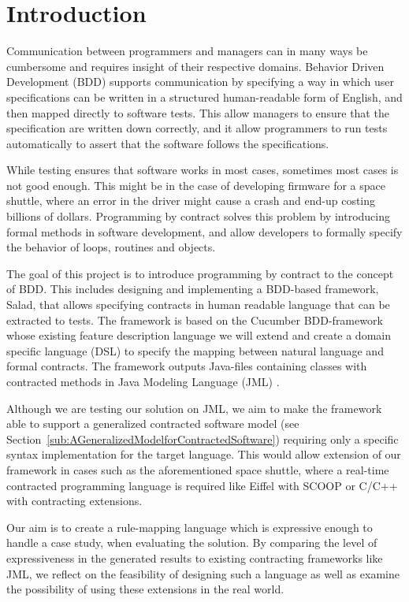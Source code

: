 \section{Introduction} %

Communication between programmers and managers can in many ways be cumbersome and requires insight of their respective domains.
Behavior Driven Development (BDD) supports communication by specifying a way in which user specifications can be written in a structured human-readable form of English, and then mapped directly to software tests.
This allow managers to ensure that the specification are written down correctly, and it allow programmers to run tests automatically to assert that the software follows the specifications. 

While testing ensures that software works in most cases, sometimes most cases is not good enough.
This might be in the case of developing firmware for a space shuttle, where an error in the driver might cause a crash and end-up costing billions of dollars.
Programming by contract \cite{meyer1992} solves this problem by introducing formal methods in software development, 
and allow developers to formally specify the behavior of loops, routines and objects.

The goal of this project is to introduce programming by contract to the concept of BDD.
This includes designing and implementing a BDD-based framework, Salad, that allows specifying contracts in human readable language that can be extracted to tests.
The framework is based on the Cucumber BDD-framework \cite{hellesoy2012} whose existing feature description language we will extend and create a domain specific language (DSL) to specify the mapping between natural language and formal contracts.
The framework outputs Java-files containing classes with contracted methods in Java Modeling Language (JML) \cite{leavens2006design}.

Although we are testing our solution on JML, we aim to make the framework able to support a generalized contracted software model (see Section~\ref{sub:AGeneralizedModelforContractedSoftware}) requiring
only a specific syntax implementation for the target language. This would allow extension of our framework in cases such as the aforementioned space shuttle,
where a real-time contracted programming language is required like Eiffel with SCOOP\cite{eiffel2012scoop} or C/C++ with contracting extensions\cite{digitalmars2011contractprogramming}.

Our aim is to create a rule-mapping language which is expressive enough to handle a case study, when evaluating the solution.
By comparing the level of expressiveness in the generated results to existing contracting frameworks like JML, 
we reflect on the feasibility of designing such a language as well as examine the possibility of using these extensions in the real world.

